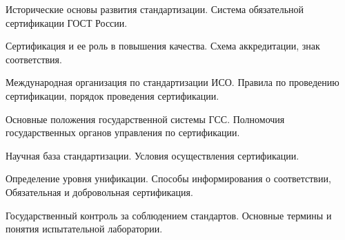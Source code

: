 \documentclass[
	14pt,
	a4paper,
	]
	{scrartcl}
\begin{document}
\vfill

\newpage


\shapk
{}
\setcounter{zad}{0}

\vfill
\z Исторические основы развития стандартизации.
 \vfill
\z Система обязательной сертификации ГОСТ России.
 \vfill

\vfill

\newpage


\shapk
{}
\setcounter{zad}{0}

\vfill
\z Сертификация и ее роль в повышения качества.
 \vfill
\z Схема аккредитации, знак соответствия.
 \vfill

\vfill

\newpage


\shapk
{}
\setcounter{zad}{0}

\vfill
\z Международная организация по стандартизации ИСО.
 \vfill
\z Правила по проведению сертификации, порядок проведения сертификации.
 \vfill

\vfill

\newpage


\shapk
{}
\setcounter{zad}{0}

\vfill
\z Основные положения государственной системы ГСС.
 \vfill
\z Полномочия государственных органов управления по сертификации.
 \vfill

\vfill

\newpage


\shapk
{}
\setcounter{zad}{0}

\vfill
\z Научная база стандартизации.
 \vfill
\z Условия осуществления сертификации.
 \vfill

\vfill

\newpage


\shapk
{}
\setcounter{zad}{0}

\vfill
\z Определение уровня унификации.
 \vfill
\z Способы информирования о соответствии, Обязательная и добровольная сертификация.
 \vfill

\vfill

\newpage


\shapk
{}
\setcounter{zad}{0}

\vfill
\z Государственный контроль за соблюдением стандартов.
 \vfill
\z Основные термины и понятия испытательной лаборатории.
 \vfill

\vfill
\end{document}
